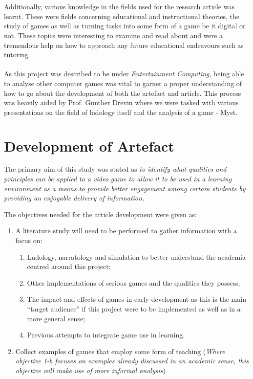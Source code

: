 \\\\
Additionally, various knowledge in the fields used for the research article was learnt. These were fields concerning educational and instructional theories, the study of games as well as turning tasks into some form of a game be it digital or not. These topics were interesting to examine and read about and were a tremendous help on how to approach any future educational endeavours such as tutoring. 
\\\\
As this project was described to be under \textit{Entertainment Computing}, being able to analyse other computer games was vital to garner a proper understanding of how to go about the development of both the artefact and article. This process was heavily aided by Prof. Günther Drevin where we were tasked with various presentations on the field of ludology itself and the analysis of a game - Myst.

\section{Development of Artefact}
The primary aim of this study was stated as \textit{to identify what qualities and principles can be applied to a video game to allow it to be used in a learning environment as a means to provide better engagement among certain students by providing an enjoyable delivery of information.}

The objectives needed for the article development were given as:
\begin{enumerate}
\item A literature study will need to be performed to gather information with a focus on:
\begin{enumerate}
\item Ludology, narratology and simulation to better understand the academia centred around this project;
\item Other implementations of serious games and the qualities they possess;
\item The impact and effects of games in early development as this is the main “target audience” if this project were to be implemented as well as in a more general sense;
\item Previous attempts to integrate game use in learning.
\end{enumerate}
\item Collect examples of games that employ some form of teaching 
(\textit{Where objective 1-b focuses on examples already discussed in an academic sense, this objective will make use of more informal analysis})
\end{enumerate}

